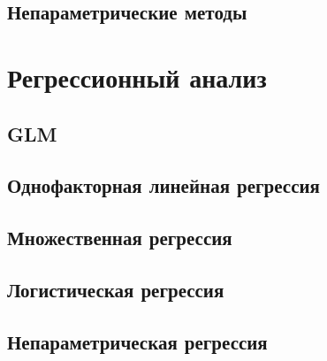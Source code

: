 \documentclass[]{scrartcl}
\begin{document}
\subsection{Непараметрические методы}

\section{Регрессионный анализ}

\subsection{GLM}

\subsection{Однофакторная линейная регрессия}

\subsection{Множественная регрессия}

\subsection{Логистическая регрессия}

\subsection{Непараметрическая регрессия}
\end{document}
